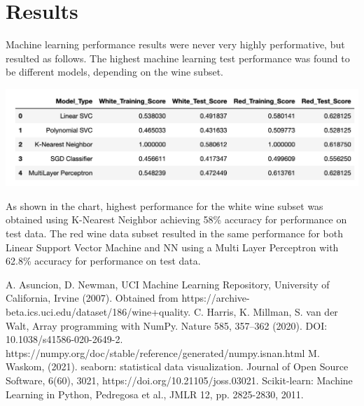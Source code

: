 \documentclass[titlepage]{article}
\begin{document}
	\section*{Results}
	Machine learning performance results were never very highly performative, but resulted as follows.  The highest machine learning test performance was found to be different models, depending on the wine subset.  
	\begin{center}
		 \includegraphics[width=.5\textwidth]{img/results.png}
	\end{center}
	
As shown in the chart, highest performance for the white wine subset was obtained using K-Nearest Neighbor achieving 58\% accuracy for performance on test data.  The red wine data subset resulted in the same performance for both Linear Support Vector Machine and NN using a Multi Layer Perceptron with 62.8\% accuracy for performance on test data.
	
	
\begin{thebibliography}{9}
	 A. Asuncion, D. Newman, UCI Machine Learning Repository, University of California, Irvine  (2007).  Obtained from https://archive-beta.ics.uci.edu/dataset/186/wine+quality. 
	 C. Harris, K. Millman, S. van der Walt,  Array programming with NumPy. Nature 585, 357–362 (2020). DOI: 10.1038/s41586-020-2649-2.  https://numpy.org/doc/stable/reference/generated/numpy.isnan.html
	 M. Waskom, (2021). seaborn: statistical data visualization. Journal of Open Source Software, 6(60), 3021, https://doi.org/10.21105/joss.03021.
	Scikit-learn: Machine Learning in Python, Pedregosa et al., JMLR 12, pp. 2825-2830, 2011. 
\end{thebibliography}
\end{document}

